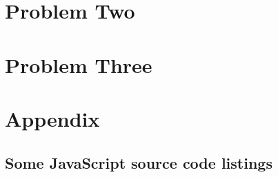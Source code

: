 \documentclass[letterpaper, 10pt,DIV=13]{scrartcl}
\numberwithin{equation}{section} %
\numberwithin{figure}{section} %
\numberwithin{table}{section} %
\begin{document}
\section{Problem Two}


\pagebreak

\section{Problem Three}


\pagebreak


 

\pagebreak


\section{Appendix}

\subsection{Some JavaScript source code listings}
\end{document}
